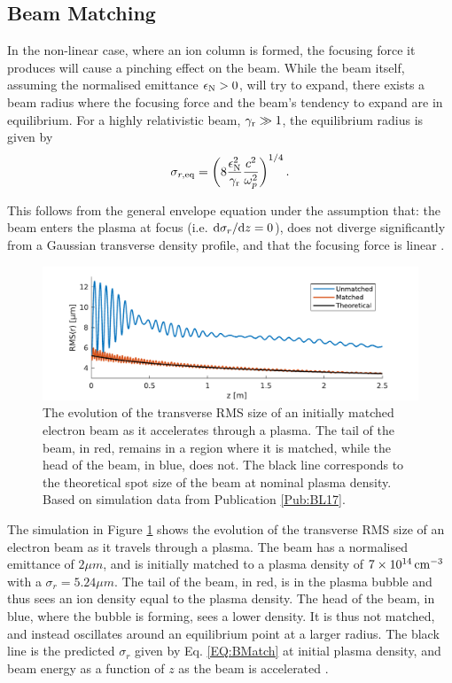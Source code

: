 \subsection{Beam Matching}
\label{Int:BPI:Match}

In the non-linear case, where an ion column is formed, the focusing force it produces will cause a pinching effect on the beam. While the beam itself, assuming the normalised emittance $\epsilon_{\mathrm{N}} > 0$, will try to expand, there exists a beam radius where the focusing force and the beam's tendency to expand are in equilibrium. For a highly relativistic beam, $\gamma_{\mathrm{r}} \gg 1$, the equilibrium radius is given by \cite{krall:1995}
\begin{equation}
    \sigma_{r,\mathrm{eq}} = \left( 8 \frac{\epsilon_{\mathrm{N}}^2}{\gamma_{\mathrm{r}}} \frac{c^2}{\omega_{p}^2} \right)^{1/4}. \label{EQ:BMatch}
\end{equation}

This follows from the general envelope equation \cite{lee:1976} under the assumption that: the beam enters the plasma at focus (i.e. $\mathrm{d}\sigma_{r}/\mathrm{d} z = 0$), does not diverge significantly from a Gaussian transverse density profile, and that the focusing force is linear \cite{krall:1995}.

\begin{figure}[hbt]
    \centering
    \includegraphics[width=0.875\linewidth,trim={0mm 0mm 0mm 0mm},clip]{figures/BeamMatching}
    \caption{\label{Fig:BPI:Match} The evolution of the transverse RMS size of an initially matched electron beam as it accelerates through a plasma. The tail of the beam, in red, remains in a region where it is matched, while the head of the beam, in blue, does not. The black line corresponds to the theoretical spot size of the beam at nominal plasma density. Based on simulation data from Publication \ref{Pub:BL17}.}
\end{figure}

The simulation in Figure \ref{Fig:BPI:Match} shows the evolution of the transverse RMS size of an electron beam as it travels through a plasma. The beam has a normalised emittance of $2\unit{\mu m}$, and is initially matched to a plasma density of $7\times 10^{14}\,\mathrm{cm}^{-3}$ with a $\sigma_{r} = 5.24\unit{\mu m}$. The tail of the beam, in red, is in the plasma bubble and thus sees an ion density equal to the plasma density. The head of the beam, in blue, where the bubble is forming, sees a lower density. It is thus not matched, and instead oscillates around an equilibrium point at a larger radius. The black line is the predicted $\sigma_{r}$ given by Eq. \ref{EQ:BMatch} at initial plasma density, and beam energy as a function of $z$ as the beam is accelerated \cite{berglyd_olsen:2018}.

